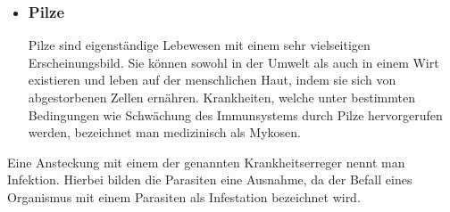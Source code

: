 \documentclass[12pt]{article}
\begin{document}
\begin{itemize}
    \item \subsubsection{Pilze}
    Pilze sind eigenständige Lebewesen mit einem sehr vielseitigen Erscheinungsbild. Sie können sowohl in der Umwelt als auch in einem Wirt existieren und leben auf der menschlichen Haut, indem sie sich von abgestorbenen Zellen ernähren. Krankheiten, welche unter bestimmten Bedingungen wie Schwächung des Immunsystems durch Pilze hervorgerufen werden, bezeichnet man medizinisch als Mykosen.
    
\end{itemize}
Eine Ansteckung mit einem der genannten Krankheitserreger nennt man Infektion. Hierbei bilden die Parasiten eine Ausnahme, da der Befall eines Organismus mit einem Parasiten als Infestation bezeichnet wird.
\end{document}
